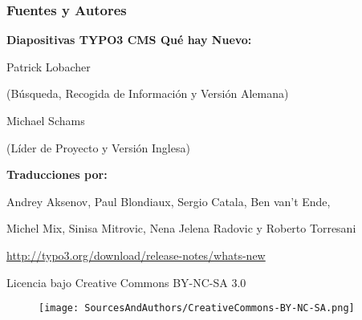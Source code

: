 \begin{frame}[fragile]
	\frametitle{Fuentes y Autores}

	\vspace{-0.6cm}

	\centerline{\textbf{Diapositivas TYPO3 CMS Qué hay Nuevo:}}

	\begin{center}
		\smaller
			\centerline{Patrick Lobacher}
			\centerline{(Búsqueda, Recogida de Información y Versión Alemana)}
			\vspace{0.1cm}
			\centerline{Michael Schams}
			\centerline{(Líder de Proyecto y Versión Inglesa)}
		\normalsize
	\end{center}
	\vspace{-0.6cm}
	\begin{center}
		\smaller
			\centerline{\textbf{Traducciones por:}}
			\centerline{Andrey Aksenov, Paul Blondiaux, Sergio Catala, Ben van't Ende,}
			\centerline{Michel Mix, Sinisa Mitrovic, Nena Jelena Radovic y Roberto Torresani}
		\normalsize
	\end{center}
	\vspace{-0.6cm}
	\smaller\begin{center}\url{http://typo3.org/download/release-notes/whats-new}\end{center}\normalsize

	\smaller\begin{center}Licencia bajo Creative Commons BY-NC-SA 3.0\end{center}\normalsize
	\begin{figure}\vspace*{-0.3cm}
		\texttt{[image: SourcesAndAuthors/CreativeCommons-BY-NC-SA.png]}
	\end{figure}

\end{frame}

